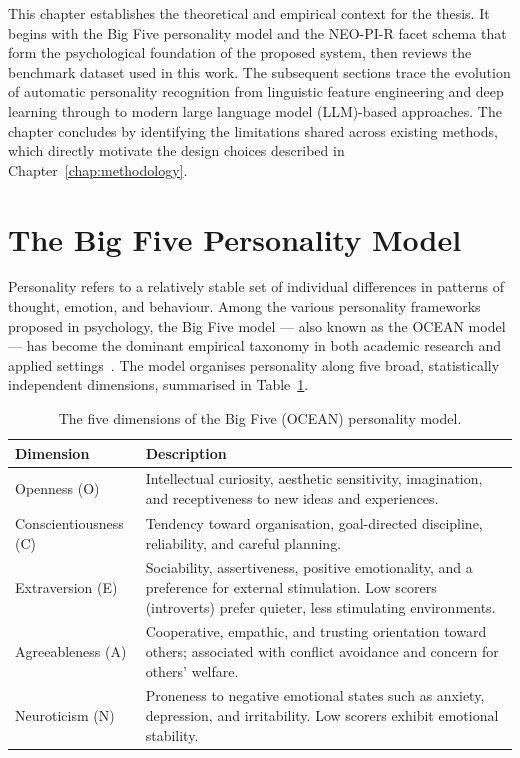 \documentclass[../main.tex]{subfiles}
\begin{document}
This chapter establishes the theoretical and empirical context for the thesis. It begins with the Big Five personality model and the NEO-PI-R facet schema that form the psychological foundation of the proposed system, then reviews the benchmark dataset used in this work. The subsequent sections trace the evolution of automatic personality recognition from linguistic feature engineering and deep learning through to modern large language model (LLM)-based approaches. The chapter concludes by identifying the limitations shared across existing methods, which directly motivate the design choices described in Chapter~\ref{chap:methodology}.

\section{The Big Five Personality Model}
\label{sec:bigfive}

Personality refers to a relatively stable set of individual differences in patterns of thought, emotion, and behaviour. Among the various personality frameworks proposed in psychology, the Big Five model --- also known as the OCEAN model --- has become the dominant empirical taxonomy in both academic research and applied settings~\cite{mccrae1992introduction,digman1990personality,tupes1992recurrent}. The model organises personality along five broad, statistically independent dimensions, summarised in Table~\ref{tab:big5}.

\begin{table}[ht]
  \centering
  \caption{The five dimensions of the Big Five (OCEAN) personality model.}
  \label{tab:big5}
  \begin{tabular}{p{2.8cm} p{9.5cm}}
    \toprule
    \textbf{Dimension} & \textbf{Description} \\
    \midrule
    Openness (O)        & Intellectual curiosity, aesthetic sensitivity, imagination, and receptiveness to new ideas and experiences. \\[4pt]
    Conscientiousness (C) & Tendency toward organisation, goal-directed discipline, reliability, and careful planning. \\[4pt]
    Extraversion (E)    & Sociability, assertiveness, positive emotionality, and a preference for external stimulation. Low scorers (introverts) prefer quieter, less stimulating environments. \\[4pt]
    Agreeableness (A)   & Cooperative, empathic, and trusting orientation toward others; associated with conflict avoidance and concern for others' welfare. \\[4pt]
    Neuroticism (N)     & Proneness to negative emotional states such as anxiety, depression, and irritability. Low scorers exhibit emotional stability. \\
    \bottomrule
  \end{tabular}
\end{table}
\end{document}
